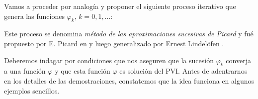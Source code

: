 Vamos a proceder por analogía y proponer el siguiente proceso iterativo que genera las funciones $\varphi_k$, $k=0,1,\ldots$:


Este proceso se denomina \emph{método de las aproximaciones sucesivas de Picard} y fué propuesto por E. Picard en  \cite{EmilePicard1893} y luego generalizado por \href{https://es.wikipedia.org/wiki/Ernst_Leonard_Lindel%C3%B6f}{Ernest Lindelöf}\link  en \cite{ErnestLindelof1894}. 



Deberemos indagar por condiciones que nos aseguren que la sucesión $\varphi_k$ converja a una función $\varphi$ y que esta función $\varphi$ es solución del PVI. Antes de adentrarnos en los detalles de las demostraciones, constatemos que la idea funciona en algunos ejemplos sencillos.

